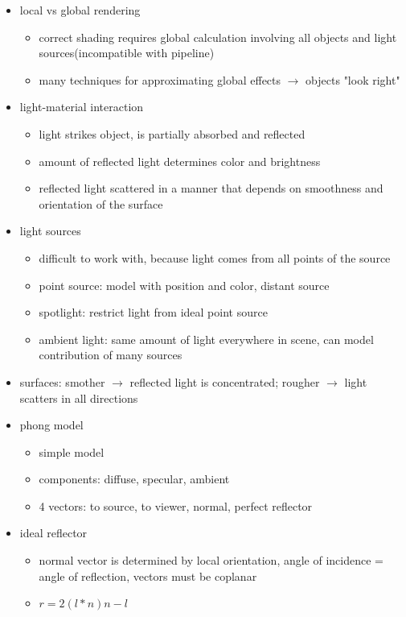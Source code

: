 \documentclass[11pt,a4paper]{article}
\begin{document}
\begin{itemize}
\begin{itemize}
	\end{itemize}
	\item local vs global rendering
	\begin{itemize}
		\item correct shading requires global calculation involving all objects and light sources(incompatible with pipeline)
		\item many techniques for approximating global effects $\rightarrow$ objects "look right"
	\end{itemize}
	\item light-material interaction
	\begin{itemize}
		\item light strikes object, is partially absorbed and reflected
		\item amount of reflected light determines color and brightness
		\item reflected light scattered in a manner that depends on smoothness and orientation of the surface
	\end{itemize}
	\item light sources
	\begin{itemize}
		\item difficult to work with, because light comes from all points of the source
		\item point source: model with position and color,  distant source
		\item spotlight: restrict light from ideal point source
		\item ambient light: same amount of light everywhere in scene, can model contribution of many sources
	\end{itemize}
	\item surfaces: smother $\rightarrow$  reflected light is concentrated; rougher $\rightarrow$ light scatters in all directions
	\item phong model
	\begin{itemize}
		\item simple model
		\item components: diffuse, specular, ambient
		\item 4 vectors: to source, to viewer, normal, perfect reflector
	\end{itemize}
	\item ideal reflector
	\begin{itemize}
		\item normal vector is determined by local orientation, angle of incidence = angle of reflection, vectors must be coplanar
		\item $r=2(l*n)n-l$

\end{itemize}
\end{itemize}
\end{document}
